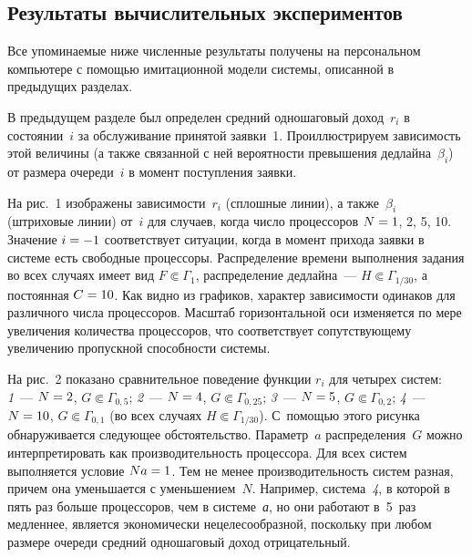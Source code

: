 \begin{multicols}{2}
\vspace*{-6pt}

\section{Результаты вычислительных экспериментов}

\vspace*{-2pt}

  Все упоминаемые ниже численные результаты получены на персональном компьютере 
с по\-мощью имитационной модели системы, описанной в предыдущих разделах.
  
  В предыдущем разделе был определен средний одношаговый доход~$r_i$ в 
состоянии~$i$ за обслуживание принятой заявки~1. Проиллюстрируем зависимость этой 
величины (а также связанной с ней вероятности превышения дедлайна~$\beta_i$) от 
размера очереди~$i$ в момент поступления заявки.



На рис.~1 изображены зависимости~$r_i$ (сплошные линии), а также~$\beta_i$ 
(штриховые линии) от~$i$ для случаев, когда число процессоров $N\hm= 1$, 2, 5, 10. 
Значение $i\hm=-1$ соответствует ситуации, когда в момент прихода заявки в системе 
есть свободные процессоры. Распределение времени выполнения задания во всех случаях 
имеет вид $F\Subset \Gamma_1$, распределение дедлайна~--- $H\Subset \Gamma_{1/30}$, а 
постоянная $C\hm=10$. Как видно из графиков, характер зависимости одинаков для 
различного числа процессоров. Масштаб горизонтальной оси изменяется по мере 
увеличения количества процессоров, что соответствует сопутствующему увеличению 
пропускной способности системы.
  
  На рис.~2 показано сравнительное поведение функции $r_i$ для четырех систем: 
\textit{1}~--- $N\hm=2$, $G\Subset \Gamma_{0{,}5}$; 
\textit{2}~--- $N\hm=4$, $G\Subset \Gamma_{0{,}25}$; 
\textit{3}~--- $N\hm=5$, $G\Subset\Gamma_{0{,}2}$; 
\textit{4}~--- $N\hm=10$, $G\Subset \Gamma_{0{,}1}$ (во 
всех случаях $H\Subset \Gamma_{1/30}$). С~помощью этого рисунка обнаруживается 
следу\-ющее обстоятельство. Параметр~$a$ распределения~$G$ можно интерпретировать 
как производительность процессора. Для всех систем выполняется условие $Na\hm=1$. 
Тем не менее производительность систем разная, причем она уменьшается с 
уменьшением~$N$. Например, система~\textit{4}, в которой в пять раз больше 
процессоров, чем в системе~\textit{а}, но они работают в~5~раз медленнее, является 
экономически нецелесообразной, поскольку при любом размере очереди средний 
одношаговый доход отрицательный.


\end{multicols}
